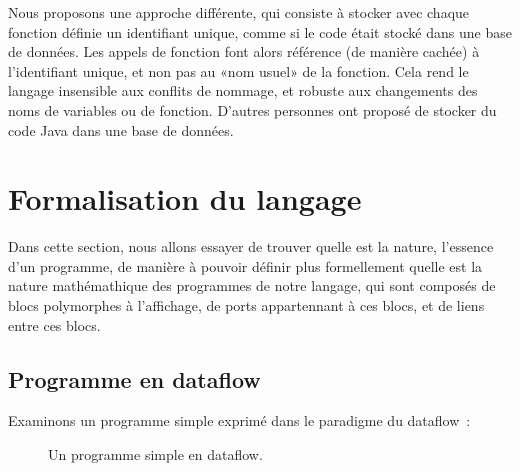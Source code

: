 \documentclass{article}
\begin{document}
Nous proposons une approche différente, qui consiste à stocker avec chaque fonction définie un identifiant unique, comme si le code était
stocké dans une base de données. Les appels de fonction font alors référence (de manière cachée) à l'identifiant unique, et non pas au «nom
usuel» de la fonction. Cela rend le langage insensible aux conflits de nommage, et robuste aux changements des noms de variables ou de
fonction. D'autres personnes ont proposé de stocker du code Java dans une base de données\cite{scid}.

\section{Formalisation du langage}

Dans cette section, nous allons essayer de trouver quelle est la nature, l'essence d'un programme, de manière à pouvoir définir plus
formellement quelle est la nature mathémathique des programmes de notre langage, qui sont composés de blocs polymorphes à l'affichage, de
ports appartennant à ces blocs, et de liens entre ces blocs.

\subsection{Programme en dataflow}

Examinons un programme simple exprimé dans le paradigme du dataflow~:

\begin{figure}[h]
  \centering
  \caption{Un programme simple en dataflow.}
\label{fig:simple-dataflow}
\end{figure}
\end{document}
